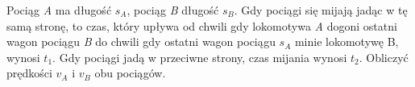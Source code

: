 Pociąg \emph{A} ma długość \emph{$s_A$}, pociąg \emph{B} długość \emph{$s_B$}. Gdy pociągi się mijają jadąc w tę samą stronę, to czas, który upływa od chwili gdy lokomotywa \emph{A} dogoni ostatni wagon pociągu \emph{B} do chwili gdy ostatni wagon pociągu \emph{$s_A$} minie lokomotywę B, wynosi \emph{$t_1$}. Gdy pociągi jadą w przeciwne strony, czas mijania wynosi \emph{$t_2$}. Obliczyć prędkości \emph{$v_A$} i \emph{$v_B$} obu pociągów.


